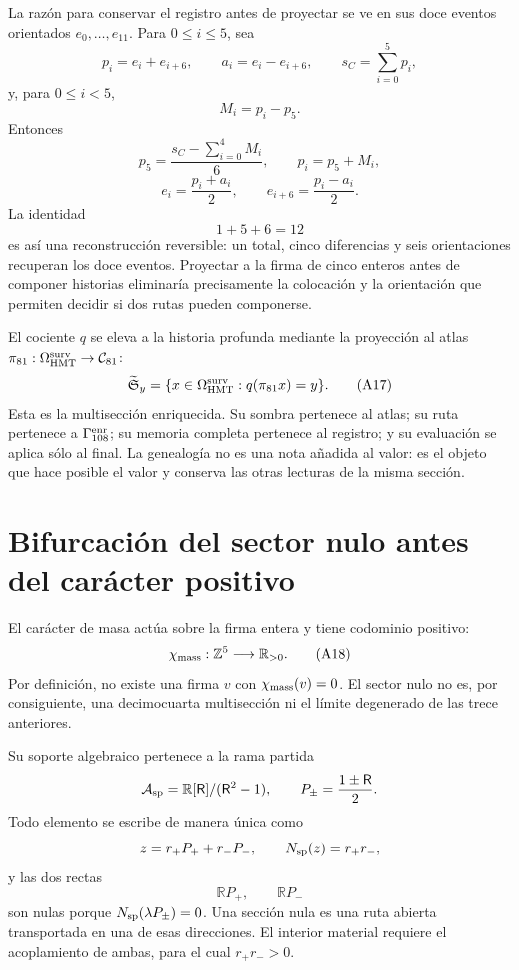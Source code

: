La razón para conservar el registro antes de proyectar se ve en sus doce
eventos orientados \(e_0,\ldots,e_{11}\).  Para \(0\leq i\leq5\), sea
\[
 p_i=e_i+e_{i+6},
 \qquad
 a_i=e_i-e_{i+6},
 \qquad
 s_C=\sum_{i=0}^{5}p_i,
\]
y, para \(0\leq i<5\),
\[
 M_i=p_i-p_5.
\]
Entonces
\[
 p_5=\frac{s_C-\sum_{i=0}^{4}M_i}{6},
 \qquad
 p_i=p_5+M_i,
\]
\[
 e_i=\frac{p_i+a_i}{2},
 \qquad
 e_{i+6}=\frac{p_i-a_i}{2}.
 \tag{A16}\label{eq:reconstruccion-registro-doce}
\]
La identidad
\[
 1+5+6=12
\]
es así una reconstrucción reversible: un total, cinco diferencias y seis
orientaciones recuperan los doce eventos.  Proyectar a la firma de cinco
enteros antes de componer historias eliminaría precisamente la colocación y
la orientación que permiten decidir si dos rutas pueden componerse.

El cociente \(q\) se eleva a la historia profunda mediante la proyección al atlas
\(\pi_{81}:\Omega_{\rm HMT}^{\rm surv}\to\mathcal C_{81}\):
\[
 \widetilde{\mathfrak S}_y
 =\{x\in\Omega_{\rm HMT}^{\rm surv}:q(\pi_{81}x)=y\}.
 \tag{A17}\label{eq:multiseccion-enriquecida-rev6}
\]
Esta es la multisección enriquecida.  Su sombra pertenece al atlas; su ruta
pertenece a \(\Gamma_{108}^{\rm enr}\); su memoria completa pertenece al
registro; y su evaluación se aplica sólo al final.  La genealogía no es una
nota añadida al valor: es el objeto que hace posible el valor y conserva las
otras lecturas de la misma sección.

\section{Bifurcación del sector nulo antes del carácter positivo}

El carácter de masa actúa sobre la firma entera y tiene codominio positivo:
\[
 \chi_{\rm mass}:\mathbb Z^5\longrightarrow\mathbb R_{>0}.
 \tag{A18}\label{eq:caracter-positivo-atlas-rev6}
\]
Por definición, no existe una firma \(v\) con
\(\chi_{\rm mass}(v)=0\).  El sector nulo no es, por consiguiente, una
decimocuarta multisección ni el límite degenerado de las trece anteriores.

Su soporte algebraico pertenece a la rama partida
\[
 \mathcal A_{\rm sp}
 =\mathbb R[\mathsf R]/(\mathsf R^2-1),
 \qquad
 P_\pm=\frac{1\pm\mathsf R}{2}.
\]
Todo elemento se escribe de manera única como
\[
 z=r_+P_++r_-P_-,
 \qquad
 N_{\rm sp}(z)=r_+r_-,
\]
y las dos rectas
\[
 \mathbb R P_+,\qquad\mathbb R P_-
\]
son nulas porque \(N_{\rm sp}(\lambda P_\pm)=0\).  Una sección nula es una
ruta abierta transportada en una de esas direcciones.  El interior material
requiere el acoplamiento de ambas, para el cual \(r_+r_->0\).


